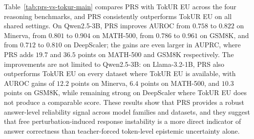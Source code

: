 \documentclass{article} %
\begin{document}
Table~\ref{tab:prs-vs-tokur-main} compares PRS with TokUR EU across the four
reasoning benchmarks, and PRS consistently outperforms TokUR EU on all shared
settings. On Qwen2.5-3B, PRS improves AUROC from $0.758$ to $0.822$ on Minerva,
from $0.801$ to $0.904$ on MATH-500, from $0.786$ to $0.961$ on GSM8K, and from
$0.712$ to $0.810$ on DeepScaler; the gains are even larger in AUPRC, where PRS
adds $19.7$ and $36.5$ points on MATH-500 and GSM8K respectively. The
improvements are not limited to Qwen2.5-3B: on Llama-3.2-1B, PRS also outperforms
TokUR EU on every dataset where TokUR EU is available, with AUROC gains of $12.2$
points on Minerva, $6.4$ points on MATH-500, and $10.3$ points on GSM8K, while
remaining strong on DeepScaler where TokUR EU does not produce a comparable
score. These results show that PRS provides a robust answer-level reliability
signal across model families and datasets, and they suggest that free
perturbation-induced response instability is a more direct indicator of answer
correctness than teacher-forced token-level epistemic uncertainty alone.
\end{document}
